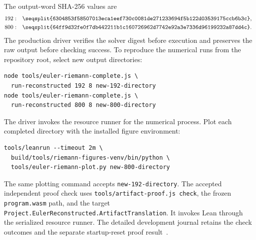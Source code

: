 \documentclass[11pt]{article}
\newcommand{\code}[1]{\texttt{#1}}
\newcommand{\longcode}[1]{\texttt{\seqsplit{#1}}}
\begin{document}
The output-word SHA-256 values are
\begin{align*}
192:&\quad\text{\longcode{6304853f58507013eca1eef730c0081de271233694f5b122d03539175ccb6b3c}},\\
800:&\quad\text{\longcode{64ff9d32fe0f7db442211b1c160726962d7742e92a3e7336d96199232a87dd4c}}.
\end{align*}
The production driver verifies the solver digest before execution and preserves the raw output before checking success.  To reproduce the numerical runs from the repository root, select new output directories:
\begin{verbatim}
node tools/euler-riemann-complete.js \
  run-reconstructed 192 8 new-192-directory
node tools/euler-riemann-complete.js \
  run-reconstructed 800 8 new-800-directory
\end{verbatim}
The driver invokes the resource runner for the numerical process.  Plot each completed directory with the installed figure environment:
\begin{verbatim}
tools/leanrun --timeout 2m \
  build/tools/riemann-figures-venv/bin/python \
  tools/euler-riemann-plot.py new-800-directory
\end{verbatim}
The same plotting command accepts \code{new-192-directory}.  The accepted independent proof check uses \code{tools/artifact-proof.js check}, the frozen \code{program.wasm} path, and the target \code{Project.EulerReconstructed.ArtifactTranslation}.  It invokes Lean through the serialized resource runner.  The detailed development journal retains the check outcomes and the separate startup-reset proof result~\cite{journal}.
\end{document}
